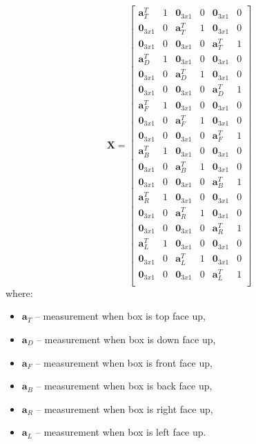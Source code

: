 \begin{equation}
	\bm{X} = 
	\begin{bmatrix}
	\bm{a}^T_T & 1 & \bm{0}_{3x1} & 0 & \bm{0}_{3x1} & 0\\
	\bm{0}_{3x1} & 0 & \bm{a}^T_T & 1 & \bm{0}_{3x1} & 0\\
	\bm{0}_{3x1} & 0 & \bm{0}_{3x1} & 0 & \bm{a}^T_T & 1\\
	
	\bm{a}^T_D & 1 & \bm{0}_{3x1} & 0 & \bm{0}_{3x1} & 0\\
	\bm{0}_{3x1} & 0 & \bm{a}^T_D & 1 & \bm{0}_{3x1} & 0\\
	\bm{0}_{3x1} & 0 & \bm{0}_{3x1} & 0 & \bm{a}^T_D & 1\\
	
	\bm{a}^T_F & 1 & \bm{0}_{3x1} & 0 & \bm{0}_{3x1} & 0\\
	\bm{0}_{3x1} & 0 & \bm{a}^T_F & 1 & \bm{0}_{3x1} & 0\\
	\bm{0}_{3x1} & 0 & \bm{0}_{3x1} & 0 & \bm{a}^T_F & 1\\
	
	\bm{a}^T_B & 1 & \bm{0}_{3x1} & 0 & \bm{0}_{3x1} & 0\\
	\bm{0}_{3x1} & 0 & \bm{a}^T_B & 1 & \bm{0}_{3x1} & 0\\
	\bm{0}_{3x1} & 0 & \bm{0}_{3x1} & 0 & \bm{a}^T_B & 1\\
	
	\bm{a}^T_R & 1 & \bm{0}_{3x1} & 0 & \bm{0}_{3x1} & 0\\
	\bm{0}_{3x1} & 0 & \bm{a}^T_R & 1 & \bm{0}_{3x1} & 0\\
	\bm{0}_{3x1} & 0 & \bm{0}_{3x1} & 0 & \bm{a}^T_R & 1\\
	
	\bm{a}^T_L & 1 & \bm{0}_{3x1} & 0 & \bm{0}_{3x1} & 0\\
	\bm{0}_{3x1} & 0 & \bm{a}^T_L & 1 & \bm{0}_{3x1} & 0\\
	\bm{0}_{3x1} & 0 & \bm{0}_{3x1} & 0 & \bm{a}^T_L & 1\\
	\end{bmatrix} 
	\label{ols_x}
\end{equation}
where:
\begin{itemize}
	\item $\bm{a}_T$ -- measurement when box is top face up,
	\item $\bm{a}_D$ -- measurement when box is down face up,
	\item $\bm{a}_F$ -- measurement when box is front face up,
	\item $\bm{a}_B$ -- measurement when box is back face up,
	\item $\bm{a}_R$ -- measurement when box is right face up,
	\item $\bm{a}_L$ -- measurement when box is left face up.
\end{itemize}

